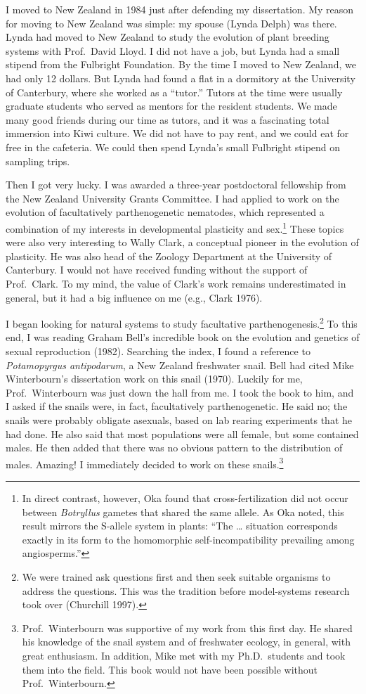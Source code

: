 \documentclass[
  letterpaper,
]{book}
\begin{document}
I moved to New Zealand in 1984 just after defending my dissertation. My
reason for moving to New Zealand was simple: my spouse (Lynda Delph) was
there. Lynda had moved to New Zealand to study the evolution of plant
breeding systems with Prof.~David Lloyd. I did not have a job, but Lynda
had a small stipend from the Fulbright Foundation. By the time I moved
to New Zealand, we had only 12 dollars. But Lynda had found a flat in a
dormitory at the University of Canterbury, where she worked as a
``tutor.'' Tutors at the time were usually graduate students who served
as mentors for the resident students. We made many good friends during
our time as tutors, and it was a fascinating total immersion into Kiwi
culture. We did not have to pay rent, and we could eat for free in the
cafeteria. We could then spend Lynda's small Fulbright stipend on
sampling trips.

Then I got very lucky. I was awarded a three-year postdoctoral
fellowship from the New Zealand University Grants Committee. I had
applied to work on the evolution of facultatively parthenogenetic
nematodes, which represented a combination of my interests in
developmental plasticity and sex.\footnote{In direct contrast, however,
  Oka found that cross-fertilization did not occur between
  \emph{Botryllus} gametes that shared the same allele. As Oka noted,
  this result mirrors the S-allele system in plants: ``The \ldots{}
  situation corresponds exactly in its form to the homomorphic
  self-incompatibility prevailing among angiosperms.''} These topics
were also very interesting to Wally Clark, a conceptual pioneer in the
evolution of plasticity. He was also head of the Zoology Department at
the University of Canterbury. I would not have received funding without
the support of Prof.~Clark. To my mind, the value of Clark's work
remains underestimated in general, but it had a big influence on me
(e.g., Clark 1976).

I began looking for natural systems to study facultative
parthenogenesis.\footnote{We were trained ask questions first and then
  seek suitable organisms to address the questions. This was the
  tradition before model-systems research took over (Churchill 1997).}
To this end, I was reading Graham Bell's incredible book on the
evolution and genetics of sexual reproduction (1982). Searching the
index, I found a reference to \emph{Potamopyrgus antipodarum}, a New
Zealand freshwater snail. Bell had cited Mike Winterbourn's dissertation
work on this snail (1970). Luckily for me, Prof.~Winterbourn was just
down the hall from me. I took the book to him, and I asked if the snails
were, in fact, facultatively parthenogenetic. He said no; the snails
were probably obligate asexuals, based on lab rearing experiments that
he had done. He also said that most populations were all female, but
some contained males. He then added that there was no obvious pattern to
the distribution of males. Amazing! I immediately decided to work on
these snails.\footnote{Prof.~Winterbourn was supportive of my work from
  this first day. He shared his knowledge of the snail system and of
  freshwater ecology, in general, with great enthusiasm. In addition,
  Mike met with my Ph.D.~students and took them into the field. This
  book would not have been possible without Prof.~Winterbourn.}
\end{document}
